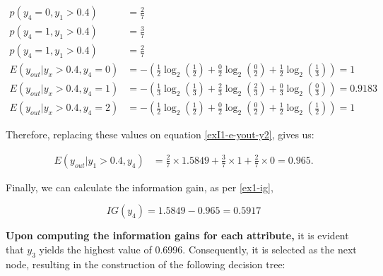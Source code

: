 \documentclass[12pt]{article}
\begin{document}
\begin{enumerate}[leftmargin=\labelsep]
    \[
        \begin{aligned}
            p(y_4 = 0, y_1 > 0.4)          & = \frac{2}{7}                                                                                     \\
            p(y_4 = 1, y_1 > 0.4)          & = \frac{3}{7}                                                                                     \\
            p(y_4 = 1, y_1 > 0.4)          & = \frac{2}{7}                                                                                     \\
            E(y_{out} | y_x > 0.4 , y_4 = 0) & = - \left(\frac{1}{2} \log_2\left(\frac{1}{2}\right) + \frac{0}{2} \log_2\left(\frac{0}{2}\right)
                + \frac{1}{2} \log_2\left(\frac{1}{3}\right)\right) = 1                                                                   \\
            E(y_{out} | y_x > 0.4 , y_4 = 1) & = - \left(\frac{1}{3} \log_2\left(\frac{1}{3}\right) + \frac{2}{3} \log_2\left(\frac{2}{3}\right)
                + \frac{0}{3} \log_2\left(\frac{0}{3}\right)\right) = 0.9183                                                                       \\
            E(y_{out} | y_x > 0.4 , y_4 = 2) & = - \left(\frac{1}{2} \log_2\left(\frac{1}{2}\right) + \frac{0}{2} \log_2\left(\frac{0}{2}\right)
                + \frac{1}{2} \log_2\left(\frac{1}{2}\right)\right) = 1
        \end{aligned}
    \]

    Therefore, replacing these values on equation \eqref{exI1-e-yout-y2}, gives us:

    \[
        \begin{aligned}
            E(y_{out} | y_1>0.4, y_4) & = \frac{2}{7} \times 1.5849 + \frac{3}{7} \times 1 +  \frac{2}{7} \times 0 = 0.965.
        \end{aligned}
    \]

    Finally, we can calculate the information gain, as per \eqref{ex1-ig},

    \[
        IG(y_{4}) = 1.5849 - 0.965 = 0.5917
    \]

    \textbf{Upon computing the information gains for each attribute,} it is evident that $y_3$ yields the highest value of 0.6996. Consequently,
        it is selected as the next node, resulting in the construction of the following decision tree:


\end{enumerate}
\end{document}
